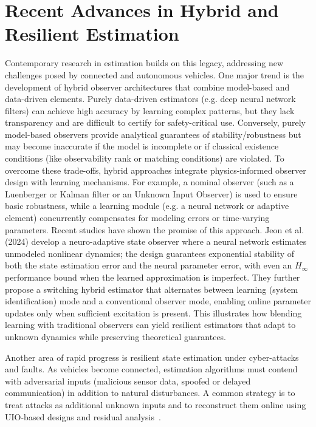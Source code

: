 \section{Recent Advances in Hybrid and Resilient Estimation}
Contemporary research in estimation builds on this legacy, addressing new challenges posed by connected and autonomous vehicles. One major trend is the development of hybrid observer architectures that combine model-based and data-driven elements. Purely data-driven estimators (e.g. deep neural network filters) can achieve high accuracy by learning complex patterns, but they lack transparency and are difficult to certify for safety-critical use. Conversely, purely model-based observers provide analytical guarantees of stability/robustness but may become inaccurate if the model is incomplete or if classical existence conditions (like observability rank or matching conditions) are violated. To overcome these trade-offs, hybrid approaches integrate physics-informed observer design with learning mechanisms. For example, a nominal observer (such as a Luenberger or Kalman filter or an Unknown Input Observer) is used to ensure basic robustness, while a learning module (e.g. a neural network or adaptive element) concurrently compensates for modeling errors or time-varying parameters. Recent studies have shown the promise of this approach. Jeon et al. (2024) develop a neuro-adaptive state observer where a neural network estimates unmodeled nonlinear dynamics; the design guarantees exponential stability of both the state estimation error and the neural parameter error, with even an $H_\infty$ performance bound when the learned approximation is imperfect. They further propose a switching hybrid estimator that alternates between learning (system identification) mode and a conventional observer mode, enabling online parameter updates only when sufficient excitation is present. This illustrates how blending learning with traditional observers can yield resilient estimators that adapt to unknown dynamics while preserving theoretical guarantees.

Another area of rapid progress is resilient state estimation under cyber-attacks and faults. As vehicles become connected, estimation algorithms must contend with adversarial inputs (malicious sensor data, spoofed or delayed communication) in addition to natural disturbances. A common strategy is to treat attacks as additional unknown inputs and to reconstruct them online using UIO-based designs and residual analysis~\cite{jeon2020simultaneous,yamamoto2021attack,cheng2023adaptive}.

